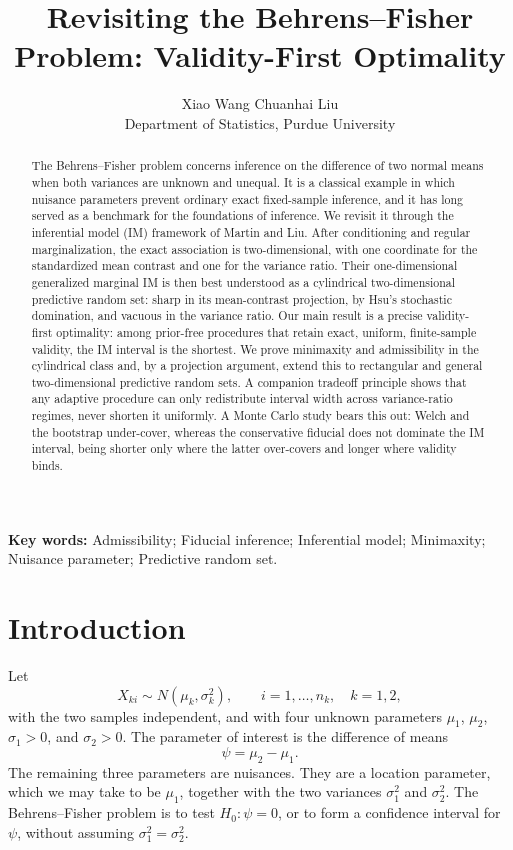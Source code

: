 \documentclass[12pt]{article}
\title{Revisiting the Behrens--Fisher Problem: Validity-First Optimality}
\author{
Xiao Wang \qquad Chuanhai Liu \\[2pt]
Department of Statistics, Purdue University
}
\date{}
\begin{document}
\maketitle

\begin{abstract}
The Behrens--Fisher problem concerns inference on the difference of two normal
means when both variances are unknown and unequal.  It is a classical example in
which nuisance parameters prevent ordinary exact fixed-sample inference, and it
has long served as a benchmark for the foundations of inference.  We revisit it
through the inferential model (IM) framework of Martin and Liu.  After
conditioning and regular marginalization, the exact association is
two-dimensional, with one coordinate for the standardized mean contrast and one
for the variance ratio.  Their one-dimensional generalized marginal IM is then
best understood as a cylindrical two-dimensional predictive random set: sharp in
its mean-contrast projection, by Hsu's stochastic domination, and vacuous in the
variance ratio.  Our main result is a precise validity-first optimality: among
prior-free procedures that retain exact, uniform, finite-sample validity, the IM
interval is the shortest.  We prove minimaxity and admissibility in the
cylindrical class and, by a projection argument, extend this to rectangular and
general two-dimensional predictive random sets.  A companion tradeoff principle
shows that any adaptive procedure can only redistribute interval width across
variance-ratio regimes, never shorten it uniformly.  A Monte Carlo study bears
this out: Welch and the bootstrap under-cover, whereas the conservative fiducial
does not dominate the IM interval, being shorter only where the latter
over-covers and longer where validity binds.
\end{abstract}

\medskip
\noindent\textbf{Key words:} Admissibility; Fiducial inference; Inferential
model; Minimaxity; Nuisance parameter; Predictive random set.

\section{Introduction}
\label{sec:intro}

Let
\[
X_{ki}\sim N(\mu_k,\sigma_k^2),\qquad i=1,\ldots,n_k,\quad k=1,2,
\]
with the two samples independent, and with four unknown parameters \(\mu_1\),
\(\mu_2\), \(\sigma_1>0\), and \(\sigma_2>0\).  The parameter of interest is the
difference of means
\[
\psi=\mu_2-\mu_1.
\]
The remaining three parameters are nuisances.  They are a location parameter,
which we may take to be \(\mu_1\), together with the two variances
\(\sigma_1^2\) and \(\sigma_2^2\).  The Behrens--Fisher problem is to test
\(H_0:\psi=0\), or to form a confidence interval for \(\psi\), without assuming
\(\sigma_1^2=\sigma_2^2\).
\end{document}
